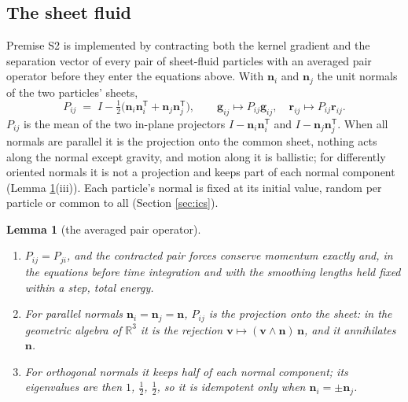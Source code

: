 \documentclass[11pt]{article}
\newtheorem{lemma}[theorem]{Lemma}
\theoremstyle{definition}
\begin{document}
\subsection{The sheet fluid}

Premise S2 is implemented by contracting both the kernel gradient and the separation vector of every pair of sheet-fluid particles with an averaged pair operator before they enter the equations above. With $\mathbf{n}_{i}$ and $\mathbf{n}_{j}$ the unit normals of the two particles' sheets,
\begin{equation}\label{eq:projector}
P_{ij} \;=\; I - \tfrac{1}{2}\bigl(\mathbf{n}_{i}\mathbf{n}_{i}^{\mathsf T} + \mathbf{n}_{j}\mathbf{n}_{j}^{\mathsf T}\bigr),
\qquad
\mathbf{g}_{ij} \mapsto P_{ij}\mathbf{g}_{ij}, \quad \mathbf{r}_{ij} \mapsto P_{ij}\mathbf{r}_{ij}.
\end{equation}
$P_{ij}$ is the mean of the two in-plane projectors $I - \mathbf{n}_{i}\mathbf{n}_{i}^{\mathsf T}$ and $I - \mathbf{n}_{j}\mathbf{n}_{j}^{\mathsf T}$. When all normals are parallel it is the projection onto the common sheet, nothing acts along the normal except gravity, and motion along it is ballistic; for differently oriented normals it is not a projection and keeps part of each normal component (Lemma \ref{lem:projector}(iii)). Each particle's normal is fixed at its initial value, random per particle or common to all (Section \ref{sec:ics}).

\begin{lemma}[the averaged pair operator]\label{lem:projector}
\begin{enumerate}
\item[(i)] $P_{ij} = P_{ji}$, and the contracted pair forces conserve momentum exactly and, in the equations before time integration and with the smoothing lengths held fixed within a step, total energy.
\item[(ii)] For parallel normals $\mathbf{n}_{i} = \mathbf{n}_{j} = \mathbf{n}$, $P_{ij}$ is the projection onto the sheet: in the geometric algebra of $\mathbb{R}^{3}$ it is the rejection $\mathbf{v} \mapsto (\mathbf{v}\wedge\mathbf{n})\,\mathbf{n}$, and it annihilates $\mathbf{n}$.
\item[(iii)] For orthogonal normals it keeps half of each normal component; its eigenvalues are then $1$, $\tfrac{1}{2}$, $\tfrac{1}{2}$, so it is idempotent only when $\mathbf{n}_{i} = \pm\mathbf{n}_{j}$.
\end{enumerate}
\end{lemma}
\end{document}
